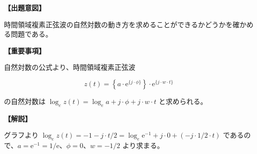 \noindent \textbf{【出題意図】}

\bigskip
\noindent 時間領域複素正弦波の自然対数の動き方を求めることができるかどうかを確かめる問題である。

\vspace{1em}
\noindent \textbf{【重要事項】}

\medskip
\noindent 自然対数の公式より、時間領域複素正弦波 

\[
z(t) =  \left \{ a \cdot \textrm{e}^{\{j \cdot \phi\}} \right \} \cdot \textrm{e}^{\{j \cdot w \cdot t \}}
\]

\bigskip
\noindent の自然対数は $\log_e z(t) =  \log_e a + j \cdot \phi + j \cdot w \cdot t$ と求められる。

\bigskip

\vspace{1em}
\noindent \textbf{【解説】}

\bigskip
\noindent グラフより $\log_e z(t) =  -1 - j \cdot t/2 = \log_e \textrm{e}^{-1} + j \cdot 0 + (-j \cdot 1/2 \cdot t)$ であるので、$a = \textrm{e}^{-1} = 1/\textrm{e}$、$\phi = 0$、$w=-1/2$ より求まる。

